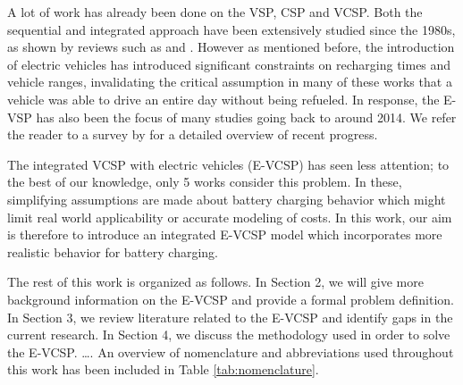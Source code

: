 \documentclass[]{article}
\begin{document}
A lot of work has already been done on the VSP, CSP and VCSP. Both the sequential and integrated approach have been extensively studied since the 1980s, as shown by reviews such as \citet{Ibarra-Rojas2015} and \citet{Ge2024}. However as mentioned before, the introduction of electric vehicles has introduced significant constraints on recharging times and vehicle ranges, invalidating the critical assumption in many of these works that a vehicle was able to drive an entire day without being refueled. In response, the E-VSP has also been the focus of many studies going back to around 2014. We refer the reader to a survey by \citet{Perumal2022LitRev} for a detailed overview of recent progress.

The integrated VCSP with electric vehicles (E-VCSP) has seen less attention; to the best of our knowledge, only 5 works consider this problem. In these, simplifying assumptions are made about battery charging behavior which might limit real world applicability or accurate modeling of costs. In this work, our aim is therefore to introduce an integrated E-VCSP model which incorporates more realistic behavior for battery charging.

The rest of this work is organized as follows. In Section 2, we will give more background information on the E-VCSP and provide a formal problem definition. In Section 3, we review literature related to the E-VCSP and identify gaps in the current research. In Section 4, we discuss the methodology used in order to solve the E-VCSP. \dots. An overview of nomenclature and abbreviations used throughout this work has been included in Table \ref{tab:nomenclature}.
\end{document}
